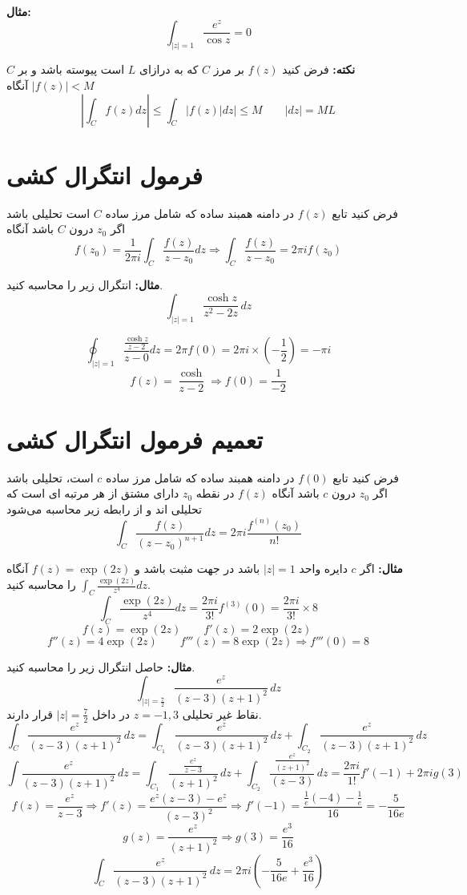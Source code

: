 \documentclass[12pt]{report}
\begin{document}
	 \textbf{مثال:}
	 $$\int_{|z| =1} \frac{e^z}{\cos z} = 0$$
	 \newline
	 
	 \textbf{نکته:}
	 فرض کنید
	 $f(z)$
	 بر مرز 
	 $C$
	 که به درازای 
	 $L$
	 است پیوسته باشد و بر 
	 $C$
	 $|f(z)| < M$
	 آنگاه 
	 $$|\int_{C} f(z)dz| \leq \int_{C} |f(z) |dz| \leq M \qquad |dz| = ML$$
	 
	 \section{فرمول انتگرال کشی}
	 فرض کنید تابع
	 $f(z)$
	 در دامنه همبند ساده که شامل مرز ساده 
	 $C$
	 است تحلیلی باشد اگر 
	 $z_0$
	 درون 
	 $C$
	 باشد آنگاه
	 $$f(z_0) = \frac{1}{2\pi i} \int_{C} \frac{f(z)}{z - z_0} dz \Rightarrow \int_{C} \frac{f(z)}{z - z_0} = 2\pi i f(z_0)$$
	 \newline
	 
	 \textbf{مثال:}
	 انتگرال زیر را محاسبه کنید.
	 $$\int_{|z| =1} \frac{\cosh z}{z^2 - 2z}\, dz$$
	 
	 $$\oint_{|z| = 1} \frac{\frac{\cosh z}{z - 2}}{z - 0} dz = 2\pi f(0) = 2\pi i \times (-\frac{1}{2}) = -\pi i$$
	 $$f(z) = \frac{\cosh }{ z -2} \Rightarrow f(0) = \frac{1}{-2}$$
	 
	 \section{تعمیم فرمول انتگرال کشی}
	 فرض کنید تابع
	$f(0)$
	در دامنه همبند ساده که شامل مرز ساده 
	$c$
	است، تحلیلی باشد اگر 
	$z_0$
	درون 
	$c$
	باشد آنگاه 
	$f(z)$
	در نقطه 
	$z_0$
	دارای مشتق از هر مرتبه ای است که تحلیلی اند و از رابطه زیر محاسبه می‌شود
	$$\int_{C} \frac{f(z)}{(z - z_0)^{n+1}} dz = 2\pi i \frac{f^{(n)}(z_0)}{n!}$$
	\newline
	
	\textbf{مثال:}
	اگر
	$c$
	دایره واحد
	$|z| = 1$
	باشد در جهت مثبت باشد و
	$f(z) = \exp(2z)$
	آنگاه
	$\int_{C} \frac{\exp(2z)}{z^4} dz$
	را محاسبه کنید.
	$$\int_{C} \frac{\exp(2z)}{z^4} dz = \frac{2\pi i }{3!} f^{(3)}(0) = \frac{2\pi i }{3!} \times 8$$
	$$f(z) = \exp(2z) \qquad
	f'(z) = 2\exp(2z)\qquad
	$$
	$$f''(z) = 4\exp(2z)\qquad
	f'''(z) = 8\exp(2z) \Rightarrow f'''(0) = 8$$
	\newline
	
	\textbf{مثال:}
	حاصل انتگرال زیر را محاسبه کنید.
	$$\int_{|z| =\frac{7}{2}} \frac{e^z}{(z - 3)(z+1)^2}\,dz$$
	نقاط غیر تحلیلی
	$z = -1, 3$
	در داخل
	$|z| =\frac{7}{2}$
	قرار دارند.
	$$\int_{C} \frac{e^z}{(z - 3)(z+1)^2}\, dz = \int_{C_1} \frac{e^z}{(z - 3)(z+1)^2}\, dz + \int_{C_2} \frac{e^z}{(z - 3)(z+1)^2}\, dz$$
	$$\int \frac{e^z}{(z - 3)(z+1)^2}\, dz = \int_{C_1} \frac{\frac{e^z}{z - 3}}{(z+1)^2}\, dz +\int_{C_2} \frac{\frac{e^z}{(z+ 1)^2}}{(z-3)}\, dz = \frac{2\pi i}{1!} f'(-1) + 2\pi i g(3)$$
	$$f(z) = \frac{e^z}{z - 3} \Rightarrow f'(z) = \frac{e^z(z - 3) - e^z}{(z - 3)^2} \Rightarrow f'(-1) = \frac{\frac{1}{e}(-4) - \frac{1}{e}}{16} = -\frac{5}{16e}$$
	$$g(z) = \frac{e^z}{(z + 1)^2} \Rightarrow g(3) = \frac{e^3}{16}$$
	$$\int_{C} \frac{e^z}{(z - 3)(z+1)^2}\, dz = 2\pi i(-\frac{5}{16e} + \frac{e^3}{16})$$
	\newline
	
\end{document}
